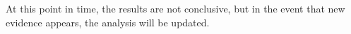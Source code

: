 At this point in time, the results are not conclusive, but in the event that new evidence appears, the analysis will be updated.
